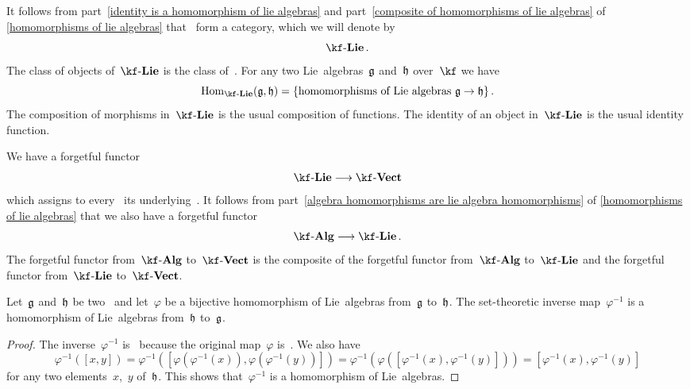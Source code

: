 \begin{remark}
  It follows from part~\ref{identity is a homomorphism of lie algebras} and part~\ref{composite of homomorphisms of lie algebras} of \cref{homomorphisms of lie algebras} that~\liealgebras{$\kf$} form a category, which we will denote by
  \[
    \cLie{\kf} \,.
  \]
  The class of objects of~$\cLie{\kf}$ is the class of~\liealgebras{$\kf$}.
  For any two Lie~algebras~$\mathfrak{g}$ and~$\mathfrak{h}$ over~$\kf$ we have
  \[
    \Hom_{\cLie{\kf}}(\glie, \hlie)
    =
    \{
      \text{homomorphisms of Lie algebras~$\textstyle \glie \to \hlie$} 
    \} \,.
  \]
  The composition of morphisms in~$\cLie{\kf}$ is the usual composition of functions.
  The identity of an object in~$\cLie{\kf}$ is the usual identity function.

  We have a forgetful functor
  \[
    \cLie{\kf}
    \to
    \cVect{\kf}
  \]
  which assigns to every~\liealgebra{$\kf$} its underlying~\vectorspace{$\kf$}.
  It follows from part~\ref{algebra homomorphisms are lie algebra homomorphisms} of \cref{homomorphisms of lie algebras} that we also have a forgetful functor
  \[
    \cAlg{\kf}
    \to
    \cLie{\kf} \,.
  \]
  The forgetful functor from~$\cAlg{\kf}$ to~$\cVect{\kf}$ is the composite of the forgetful functor from~$\cAlg{\kf}$ to~$\cLie{\kf}$ and the forgetful functor from~$\cLie{\kf}$ to~$\cVect{\kf}$.
\end{remark}


\begin{proposition}
  \label{inverse of homomorphism of lie algebras is again a homomorphism of lie algebras}
  Let~$\mathfrak{g}$ and~$\mathfrak{h}$ be two~\liealgebras{$\kf$} and let~$\varphi$ be a bijective homomorphism of Lie~algebras from~$\mathfrak{g}$ to~$\mathfrak{h}$.
  The set-theoretic inverse map~$\varphi^{-1}$ is a homomorphism of Lie~algebras from~$\mathfrak{h}$ to~$\mathfrak{g}$.
\end{proposition}


\begin{proof}
  The inverse~$\varphi^{-1}$ is~\linear{$\kf$} because the original map~$\varphi$ is~\linear{$\kf$}.
  We also have
  \[
    \varphi^{-1}( [x,y] )
    =
    \varphi^{-1}( [ \varphi(\varphi^{-1}(x)), \varphi(\varphi^{-1}(y)) ] )
    =
    \varphi^{-1}( \varphi( [ \varphi^{-1}(x), \varphi^{-1}(y) ] ) )
    =
    [ \varphi^{-1}(x), \varphi^{-1}(y) ]
  \]
  for any two elements~$x$,~$y$ of~$\mathfrak{h}$.
  This shows that~$\varphi^{-1}$ is a homomorphism of Lie~algebras.
\end{proof}


